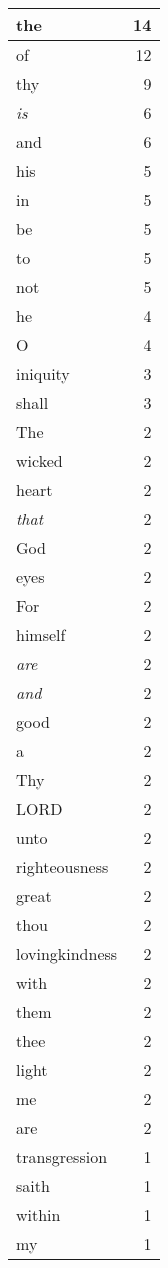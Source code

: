 \begin{center}
\begin{longtable}{l|r}
\hline \hline
\endlastfoot
the & 14 \\ \hline
of & 12 \\ \hline
thy & 9 \\ \hline
\emph{is} & 6 \\ \hline
and & 6 \\ \hline
his & 5 \\ \hline
in & 5 \\ \hline
be & 5 \\ \hline
to & 5 \\ \hline
not & 5 \\ \hline
he & 4 \\ \hline
O & 4 \\ \hline
iniquity & 3 \\ \hline
shall & 3 \\ \hline
The & 2 \\ \hline
wicked & 2 \\ \hline
heart & 2 \\ \hline
\emph{that} & 2 \\ \hline
God & 2 \\ \hline
eyes & 2 \\ \hline
For & 2 \\ \hline
himself & 2 \\ \hline
\emph{are} & 2 \\ \hline
\emph{and} & 2 \\ \hline
good & 2 \\ \hline
a & 2 \\ \hline
Thy & 2 \\ \hline
LORD & 2 \\ \hline
unto & 2 \\ \hline
righteousness & 2 \\ \hline
great & 2 \\ \hline
thou & 2 \\ \hline
lovingkindness & 2 \\ \hline
with & 2 \\ \hline
them & 2 \\ \hline
thee & 2 \\ \hline
light & 2 \\ \hline
me & 2 \\ \hline
are & 2 \\ \hline
transgression & 1 \\ \hline
saith & 1 \\ \hline
within & 1 \\ \hline
my & 1 \\ \hline

\end{longtable}
\end{center}

